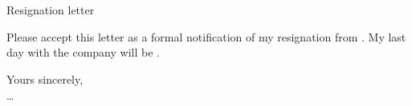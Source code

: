 \documentclass[a4paper]{letter}
\def\CompanyDetails{\ManagerName{} \\ \CompanyName{} \\ \CompanyAddress{}}
\begin{document}
\begin{letter}{\CompanyDetails{}}
{
    \opening{\noindent Resignation letter}{}
        Please accept this letter as a formal notification of my resignation from \CompanyName{}.
	My last day with the company will be \LastDay{}. %
    \closing{Yours sincerely, \\ \ldots \\ \Name}
}
\end{letter}
\end{document}
